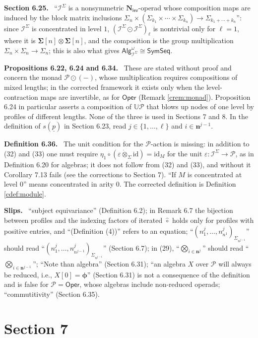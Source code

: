 \documentclass[12pt]{article}
\theoremstyle{plain}
\theoremstyle{definition}
\theoremstyle{remark}
\newcommand{\Cal}[1]{\mathcal{#1}}
\newcommand{\Nl}{\mathbf{N}_{\mathsf{lev}}}
\newcommand{\Oper}{\mathsf{Oper}}
\newcommand{\SymSeq}{\mathsf{SymSeq}}
\newcommand{\circhat}{\hat{\circ}}
\newcommand{\circdot}{\odot}
\newcommand{\tensordot}{\dot{\otimes}}
\newcommand{\Isym}{\Cal{I}^{\Sigma}}
\newcommand{\id}{\mathrm{id}}
\newcommand{\ptC}{\boldsymbol{\phi}}
\newcommand{\corr}[1]{\par\smallskip\noindent\textbf{#1.}\ }
\begin{document}
\corr{Section 6.25} ``$\Isym$ is a nonsymmetric $\Nl$-operad whose composition maps are induced by the block matrix inclusions $\Sigma_n\times(\Sigma_{k_1}\times\cdots\times\Sigma_{k_n})\to\Sigma_{k_1+\cdots+k_n}$'': since $\Isym$ is concentrated in level $1$, $(\Isym\circdot\Isym)_\ell$ is nontrivial only for $\ell=1$, where it is $\mathbf\Sigma[n]\otimes\mathbf\Sigma[n]$, and the composition is the group multiplication $\Sigma_n\times\Sigma_n\to\Sigma_n$; this is also what gives $\mathsf{Alg}^\omega_{\Isym}\cong\SymSeq$.

\corr{Propositions 6.22, 6.24 and 6.34} These are stated without proof and concern the monad $\Cal P\circdot(-)$, whose multiplication requires compositions of mixed lengths; in the corrected framework it exists only when the level-contraction maps are invertible, as for $\Oper$ (Remark \ref{crem:monad}). Proposition 6.24 in particular asserts a composition of $\mathbb U\Cal P$ that blows up nodes of one level by profiles of different lengths. None of the three is used in Sections 7 and 8. In the definition of $s(\underline p)$ in Section 6.23, read $j\in\{1,\dots,\ell\}$ and $i\in\mathbf n^{j-1}$.

\corr{Definition 6.36} The unit condition for the $\Cal P$-action is missing: in addition to (32) and (33) one must require $\eta_1\circ(\varepsilon\tensordot_\Sigma\id)=\id_M$ for the unit $\varepsilon\colon\Isym\to\Cal P$, as in Definition 6.20 for algebras; it does not follow from (32) and (33), and without it Corollary 7.13 fails (see the corrections to Section 7). ``If $M$ is concentrated at level $0$'' means concentrated in arity $0$. The corrected definition is Definition \ref{cdef:module}.

\corr{Slips} ``subject equivariance'' (Definition 6.2); in Remark 6.7 the bijection between profiles and the indexing factors of iterated $\circhat$ holds only for profiles with positive entries, and ``(Definition (4))'' refers to an equation; ``$(n^j_1,\dots,n^j_{n^1})_{\Sigma_{n^{j-1}}}$'' should read ``$(n^j_1,\dots,n^j_{n^{j-1}})_{\Sigma_{n^{j-1}}}$'' (Section 6.7); in (29), ``$\bigotimes_{i\in\mathbf n^j}$'' should read ``$\bigotimes_{i\in\mathbf n^{j-1}}$''; ``Note than algebra'' (Section 6.31); ``an algebra $X$ over $\Cal P$ will always be reduced, i.e., $X[0]=\ptC$'' (Section 6.31) is not a consequence of the definition and is false for $\Cal P=\Oper$, whose algebras include non-reduced operads; ``commutitivity'' (Section 6.35).

\section*{Section 7}
\label{sec:s7}
\end{document}
